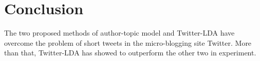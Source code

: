 \documentclass[conference,compsoc]{IEEEtran}
\begin{document}
%



\section{Conclusion}
The two proposed methods of author-topic model and Twitter-LDA have overcome the problem of short tweets in the micro-blogging site Twitter. More than that, Twitter-LDA has showed to outperform the other two in experiment.
\end{document}
